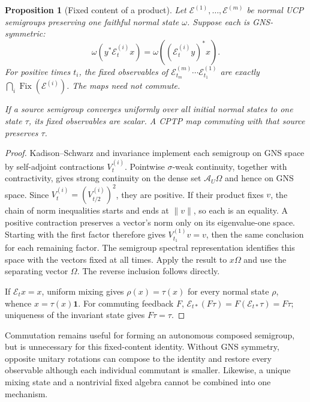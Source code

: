 \documentclass[12pt]{article}
\newtheorem{proposition}[theorem]{Proposition}
\theoremstyle{definition}
\theoremstyle{remark}
\begin{document}
\begin{proposition}[Fixed content of a product]\label{prop:fixedproduct}
Let \(\mathcal E^{(1)},\ldots,\mathcal E^{(m)}\) be normal UCP
semigroups preserving one faithful normal state \(\omega\).
Suppose each is GNS-symmetric:
\[
 \omega(y^*\mathcal E_t^{(i)}x)
 =\omega((\mathcal E_t^{(i)}y)^*x).
\]
For positive times \(t_i\), the fixed observables of
\(\mathcal E_{t_m}^{(m)}\cdots\mathcal E_{t_1}^{(1)}\) are exactly
\(\bigcap_i\operatorname{Fix}(\mathcal E^{(i)})\).
The maps need not commute.

If a source semigroup converges uniformly over all initial normal
states to one state \(\tau\), its fixed observables are scalar.
A CPTP map commuting with that source preserves \(\tau\).
\end{proposition}
\begin{proof}
Kadison--Schwarz and invariance implement each semigroup on GNS space
by self-adjoint contractions \(V_t^{(i)}\).
Pointwise \(\sigma\)-weak continuity, together with contractivity,
gives strong continuity on the dense set \(\mathcal A_U\Omega\)
and hence on GNS space.
Since \(V_t^{(i)}=(V_{t/2}^{(i)})^2\), they are positive.
If their product fixes \(v\), the chain of norm inequalities starts
and ends at \(\|v\|\), so each is an equality. A positive contraction
preserves a vector's norm only on its eigenvalue-one space. Starting
with the first factor therefore gives \(V_{t_1}^{(1)}v=v\), then
the same conclusion for each remaining factor. The semigroup spectral
representation identifies this space with the vectors fixed at all
times. Apply the result to \(x\Omega\) and use the separating vector
\(\Omega\). The reverse inclusion follows directly.

If \(\mathcal E_t x=x\), uniform mixing gives
\(\rho(x)=\tau(x)\) for every normal state \(\rho\), whence
\(x=\tau(x)\mathbf1\).
For commuting feedback \(F\),
\(\mathcal E_{t*}(F\tau)=F(\mathcal E_{t*}\tau)=F\tau\);
uniqueness of the invariant state gives \(F\tau=\tau\).
\end{proof}

Commutation remains useful for forming an autonomous composed
semigroup, but is unnecessary for this fixed-content identity.
Without GNS symmetry, opposite unitary rotations can compose to the
identity and restore every observable although each individual
commutant is smaller. Likewise, a unique mixing state and a
nontrivial fixed algebra cannot be combined into one mechanism.
\end{document}
